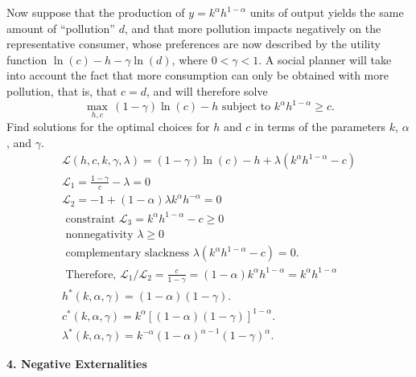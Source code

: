 \documentclass[12pt]{article}
\begin{document}
Now suppose that the production of $y=k^{\alpha}h^{1-\alpha}$ units of output yields the same amount of ``pollution'' $d$, and that more pollution impacts negatively on the representative consumer, whose preferences are now described by the utility function $\ln(c)-h-\gamma \ln(d)$, where $0<\gamma<1$. A social planner will take into account the fact that more consumption can only be obtained with more pollution, that is, that $c=d$, and will therefore solve
$$
\max_{h,c} \, (1-\gamma)\ln(c)-h \text{ subject to } k^{\alpha}h^{1-\alpha} \geq c.
$$
Find solutions for the optimal choices for $h$ and $c$ in terms of the parameters $k$, $\alpha$, and $\gamma$.
\begin{align*}
\mathcal{L}(h, c, k, \gamma, \lambda) = (1-\gamma)\ln(c) - h + \lambda(k^{\alpha}h^{1-\alpha} - c)    \\ 
\mathcal{L}_1 = \frac{1-\gamma}{c} - \lambda = 0    \\ 
\mathcal{L}_2 = -1 + (1-\alpha)\lambda k^{\alpha}h^{-\alpha} = 0    \\ 
\text{ constraint } \mathcal{L}_3 = k^{\alpha}h^{1-\alpha} - c \geq 0     \\ 
\text{ nonnegativity } \lambda \geq 0    \\ 
\text{ complementary slackness } \lambda(k^{\alpha}h^{1-\alpha} - c) = 0.     \\ 
\text{ Therefore, }  \mathcal{L}_1 / \mathcal{L}_2 = \frac{c}{1-\gamma} = (1-\alpha)k^{\alpha}h^{1-\alpha} = k^{\alpha}h^{1-\alpha}    \\ 
h^*(k, \alpha, \gamma) = (1-\alpha)(1-\gamma).    \\ 
c^*(k, \alpha, \gamma) = k^{\alpha}[(1-\alpha)(1-\gamma)]^{1-\alpha}.    \\ 
\lambda^*(k, \alpha, \gamma) = k^{-\alpha}(1-\alpha)^{\alpha-1}(1-\gamma)^{\alpha}.  
\end{align*}

{\bfseries 4. Negative Externalities}
\end{document}
